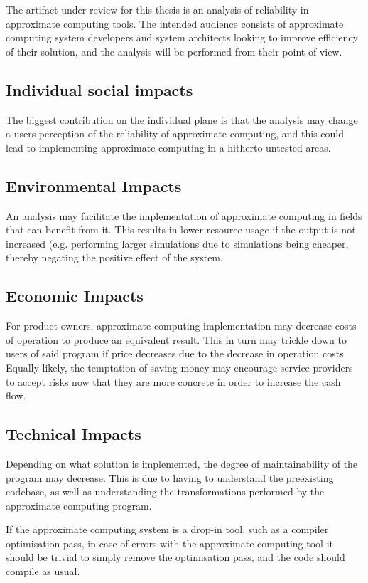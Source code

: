 The artifact under review for this thesis is an analysis of reliability in approximate computing tools. The intended audience consists of approximate computing system developers and system architects looking to improve efficiency of their solution, and the analysis will be performed from their point of view. 

\subsection{Individual social impacts}
The biggest contribution on the individual plane is that the analysis may change a users perception of the reliability of approximate computing, and this could lead to implementing approximate computing in a hitherto untested areas. 


\subsection{Environmental Impacts}
An analysis may facilitate the implementation of approximate computing in fields that can benefit from it. This results in lower resource usage if the output is not increased (e.g. performing larger simulations due to simulations being cheaper, thereby negating the positive effect of the system.

\subsection{Economic Impacts}
For product owners, approximate computing implementation may decrease costs of operation to produce an equivalent result. This in turn may trickle down to users of said program if price decreases due to the decrease in operation costs. 
Equally likely, the temptation of saving money may encourage service providers to accept risks now that they are more concrete in order to increase the cash flow.
\subsection{Technical Impacts}
Depending on what solution is implemented, the degree of maintainability of the program may decrease. This is due to having to understand the preexisting codebase, as well as understanding the transformations performed by the approximate computing program. 

If the approximate computing system is a drop-in tool, such as a compiler optimisation pass, in case of errors with the approximate computing tool it should be trivial to simply remove the optimisation pass, and the code should compile as usual.

